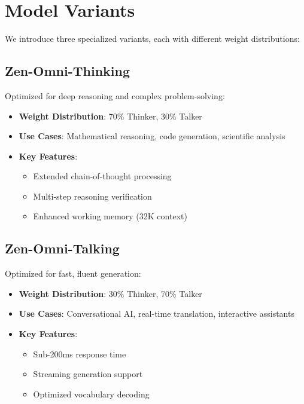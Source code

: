 \documentclass{article}
\begin{document}
\section{Model Variants}

We introduce three specialized variants, each with different weight distributions:

\subsection{Zen-Omni-Thinking}

Optimized for deep reasoning and complex problem-solving:

\begin{itemize}
    \item \textbf{Weight Distribution}: 70\% Thinker, 30\% Talker
    \item \textbf{Use Cases}: Mathematical reasoning, code generation, scientific analysis
    \item \textbf{Key Features}:
    \begin{itemize}
        \item Extended chain-of-thought processing
        \item Multi-step reasoning verification
        \item Enhanced working memory (32K context)
    \end{itemize}
\end{itemize}

\subsection{Zen-Omni-Talking}

Optimized for fast, fluent generation:

\begin{itemize}
    \item \textbf{Weight Distribution}: 30\% Thinker, 70\% Talker
    \item \textbf{Use Cases}: Conversational AI, real-time translation, interactive assistants
    \item \textbf{Key Features}:
    \begin{itemize}
        \item Sub-200ms response time
        \item Streaming generation support
        \item Optimized vocabulary decoding
    \end{itemize}
\end{itemize}
\end{document}
